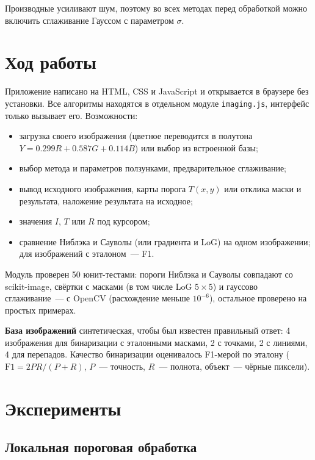 \documentclass[11pt,a4paper]{article}
\begin{document}
Производные усиливают шум, поэтому во всех методах перед обработкой можно
включить сглаживание Гауссом с параметром $\sigma$.

\section{Ход работы}
Приложение написано на HTML, CSS и JavaScript и открывается в браузере без
установки. Все алгоритмы находятся в отдельном модуле \texttt{imaging.js},
интерфейс только вызывает его. Возможности:
\begin{itemize}[label=--, leftmargin=1.5em, itemsep=0.1em, topsep=0.2em]
  \item загрузка своего изображения (цветное переводится в полутона
        $Y = 0.299R + 0.587G + 0.114B$) или выбор из встроенной базы;
  \item выбор метода и параметров ползунками, предварительное сглаживание;
  \item вывод исходного изображения, карты порога $T(x, y)$ или отклика маски
        и результата, наложение результата на исходное;
  \item значения $I$, $T$ или $R$ под курсором;
  \item сравнение Ниблэка и Сауволы (или градиента и LoG) на одном
        изображении; для изображений с эталоном~— F1.
\end{itemize}

Модуль проверен 50 юнит-тестами: пороги Ниблэка и Сауволы совпадают со
scikit-image, свёртки с масками (в том числе LoG $5 \times 5$) и гауссово
сглаживание~— с OpenCV (расхождение меньше $10^{-6}$), остальное проверено на
простых примерах.

\textbf{База изображений} синтетическая, чтобы был известен правильный ответ:
4 изображения для бинаризации с эталонными масками, 2 с точками, 2 с линиями,
4 для перепадов. Качество бинаризации оценивалось F1-мерой по эталону
($\text{F1} = 2PR / (P + R)$, $P$~— точность, $R$~— полнота, объект~— чёрные пиксели).

\section{Эксперименты}

\subsection{Локальная пороговая обработка}
\end{document}
